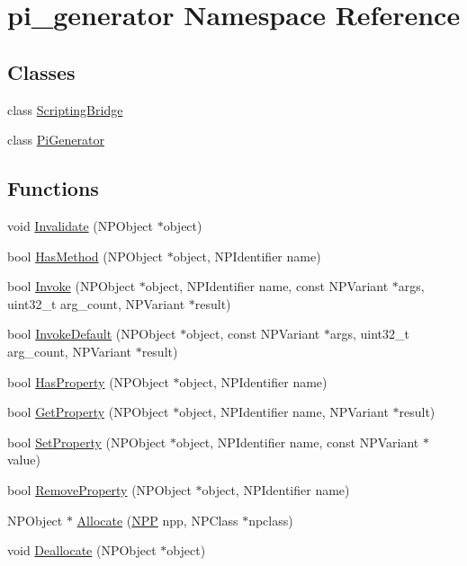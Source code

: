 \hypertarget{namespacepi__generator}{
\section{pi\_\-generator Namespace Reference}
\label{namespacepi__generator}
}
\subsection*{Classes}
\begin{DoxyCompactItemize}
\item 
class \hyperlink{classpi__generator_1_1_scripting_bridge}{ScriptingBridge}
\item 
class \hyperlink{classpi__generator_1_1_pi_generator}{PiGenerator}
\end{DoxyCompactItemize}
\subsection*{Functions}
\begin{DoxyCompactItemize}
\item 
void \hyperlink{namespacepi__generator_a733df66e71ec7f2dba460c638180aa0e}{Invalidate} (NPObject $\ast$object)
\item 
bool \hyperlink{namespacepi__generator_a952c6436fb4cc8d87e830f81f3bae284}{HasMethod} (NPObject $\ast$object, NPIdentifier name)
\item 
bool \hyperlink{namespacepi__generator_a861f69824d0671573232af470d07c0fa}{Invoke} (NPObject $\ast$object, NPIdentifier name, const NPVariant $\ast$args, uint32\_\-t arg\_\-count, NPVariant $\ast$result)
\item 
bool \hyperlink{namespacepi__generator_a7fab356f3ceba853332861bcc927c54f}{InvokeDefault} (NPObject $\ast$object, const NPVariant $\ast$args, uint32\_\-t arg\_\-count, NPVariant $\ast$result)
\item 
bool \hyperlink{namespacepi__generator_a87a1eff2d42a1e673e616057680369b7}{HasProperty} (NPObject $\ast$object, NPIdentifier name)
\item 
bool \hyperlink{namespacepi__generator_aa945b983b43a437de8e06ebbbe8f6064}{GetProperty} (NPObject $\ast$object, NPIdentifier name, NPVariant $\ast$result)
\item 
bool \hyperlink{namespacepi__generator_a54b3ed1c0ca9069974a0a575680896c9}{SetProperty} (NPObject $\ast$object, NPIdentifier name, const NPVariant $\ast$value)
\item 
bool \hyperlink{namespacepi__generator_ae5666fa423e3664b2c082f0e8b2fcfd4}{RemoveProperty} (NPObject $\ast$object, NPIdentifier name)
\item 
NPObject $\ast$ \hyperlink{namespacepi__generator_a94f67bed2d50304566aa1f7c35f91ab2}{Allocate} (\hyperlink{struct___n_p_p}{NPP} npp, NPClass $\ast$npclass)
\item 
void \hyperlink{namespacepi__generator_a36cb8ad170a393eedf2f477fa7561f62}{Deallocate} (NPObject $\ast$object)
\end{DoxyCompactItemize}



